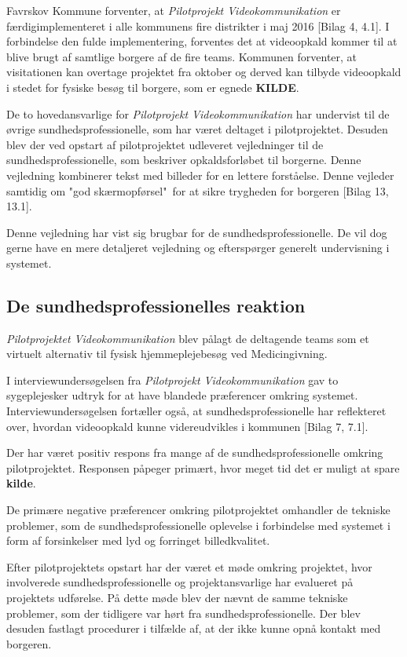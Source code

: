 Favrskov Kommune forventer, at \textit{Pilotprojekt Videokommunikation} er færdigimplementeret i alle kommunens fire distrikter i maj 2016 [Bilag 4, 4.1]. I forbindelse den fulde implementering, forventes det at videoopkald kommer til at blive brugt af samtlige borgere af de fire teams. Kommunen forventer, at visitationen kan overtage projektet fra oktober og derved kan tilbyde videoopkald i stedet for fysiske besøg til borgere, som er egnede \textbf{KILDE}.

De to hovedansvarlige for \textit{Pilotprojekt Videokommunikation} har undervist til de øvrige sundhedsprofessionelle, som har været deltaget i pilotprojektet. Desuden blev der ved opstart af pilotprojektet udleveret vejledninger til de sundhedsprofessionelle, som beskriver opkaldsforløbet til borgerne. Denne vejledning kombinerer tekst med billeder for en lettere forståelse. Denne vejleder samtidig om "god skærmopførsel"\ for at sikre trygheden for borgeren [Bilag 13, 13.1].  

Denne vejledning har vist sig brugbar for de sundhedsprofessionelle. De vil dog gerne have en mere detaljeret vejledning og efterspørger generelt undervisning i systemet.

 
\subsection{De sundhedsprofessionelles reaktion}
\textit{Pilotprojektet Videokommunikation} blev pålagt de deltagende teams som et virtuelt alternativ til fysisk hjemmeplejebesøg ved Medicingivning. 

I interviewundersøgelsen fra \textit{Pilotprojekt Videokommunikation} gav to sygeplejesker udtryk for at have blandede præferencer omkring systemet. Interviewundersøgelsen fortæller også, at sundhedsprofessionelle har reflekteret over, hvordan videoopkald kunne videreudvikles i kommunen [Bilag 7, 7.1]. 

Der har været positiv respons fra mange af de sundhedsprofessionelle omkring pilotprojektet. Responsen påpeger primært, hvor meget tid det er muligt at spare \textbf{kilde}.

De primære negative præferencer omkring pilotprojektet omhandler de tekniske problemer, som de sundhedsprofessionelle oplevelse i forbindelse med systemet i form af forsinkelser med lyd og forringet billedkvalitet. 

Efter pilotprojektets opstart har der været et møde omkring projektet, hvor involverede sundhedsprofessionelle og projektansvarlige har evalueret på projektets udførelse. På dette møde blev der nævnt de samme tekniske problemer, som der tidligere var hørt fra sundhedsprofessionelle. Der blev desuden fastlagt procedurer i tilfælde af, at der ikke kunne opnå kontakt med borgeren. 

